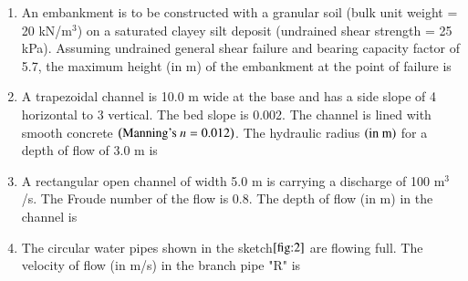 \documentclass[journal]{IEEEtran}
\numberwithin{equation}{enumi}
\numberwithin{figure}{enumi}
\begin{document}
\begin{enumerate}
\item An embankment is to be constructed with a granular soil (bulk unit weight = 20 kN/m$^3$) on a saturated clayey silt deposit (undrained shear strength = 25 kPa). Assuming undrained general shear failure and bearing capacity factor of 5.7, the maximum height (in m) of the embankment at the point of failure is

\begin{enumerate}
\end{enumerate}

\item A trapezoidal channel is 10.0 m wide at the base and has a side slope of 4 horizontal to 3 vertical. The bed slope is 0.002. The channel is lined with smooth concrete $\left(\text{Manning's } n=0.012\right)$. The hydraulic radius $\left(\text{in m}\right)$ for a depth of flow of 3.0 m is

\begin{enumerate}
\end{enumerate}

\item A rectangular open channel of width 5.0 m is carrying a discharge of 100 m$^3$/s. The Froude number of the flow is 0.8. The depth of flow (in m) in the channel is

\begin{enumerate}
\end{enumerate}
\item  The circular water pipes shown in the sketch$\ref{fig:2}$ are flowing full. The velocity of flow (in m/s) in the branch pipe "R" is
	\begin{figure}[H]
    

\end{figure}
\end{enumerate}
\end{document}

